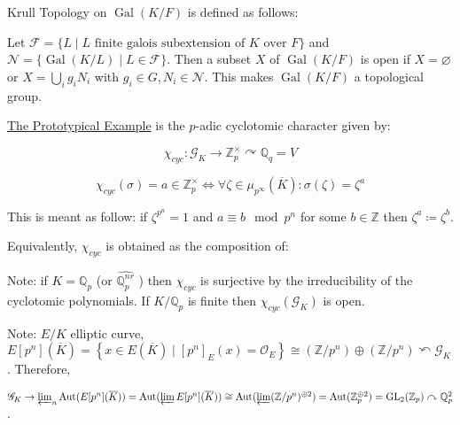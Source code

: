 \documentclass{article}
\theoremstyle{definition}
\numberwithin{theorem}{subsection}
\begin{document}
    Krull Topology on \(\operatorname{Gal}(K / F)\) is defined as follows:
    
    Let \(\mathcal{F} = \{ L \mid L \text{ finite galois subextension of } K \text{ over } F\} \) and \(\mathcal{N} = \{ \operatorname{Gal}(K / L) \mid L \in \mathcal{F} \} \). Then a subset \(X\) of \(\operatorname{Gal}(K / F)\) is open if \(X = \varnothing\) or \(X = \bigcup_i g_i N_i\) with \(g_i \in G, N_i \in \mathcal{N}\). This makes \(\operatorname{Gal}(K / F)\) a topological group.  

    \underline{The Prototypical Example} is the \(p\)-adic cyclotomic character given by:

    \[
        \chi_{cyc} : \mathscr{G}_K \to \mathbb{Z}_p^\times \curvearrowright \mathbb{Q}_q = V
    \]

    \[
        \chi_{cyc}(\sigma) = a \in \mathbb{Z}_p^\times \iff \forall \zeta \in \mu_{p^{\infty}}(\overline{K}): \sigma(\zeta) = \zeta^a
    \]

    This is meant as follow: if \(\zeta^{p^n} = 1\) and \(a \equiv b \mod p^n\) for some \(b\in \mathbb{Z}\) then \(\zeta^a \coloneqq \zeta^b\).
    
    Equivalently, \(\chi_{cyc}\) is obtained as the composition of:

    \begin{center}
    \end{center}

    Note: if \(K = \mathbb{Q}_p\) (or \(\widehat{\mathbb{Q}_p^{nr}}\) ) then \(\chi_{cyc}\) is surjective by the irreducibility of the cyclotomic polynomials. If \(K / \mathbb{Q}_{p} \) is finite then \(\chi_{cyc}(\mathscr{G}_K)\) is open.
    
    Note: \(E / K\) elliptic curve, \(E[p^n](\overline{K}) = \left\{ x\in E(\overline{K}) \mid [p^n]_E (x) = \mathcal{O}_E \right\} \cong (\mathbb{Z} / p^n) \oplus (\mathbb{Z} / p^n) \curvearrowleft \mathscr{G}_K \). Therefore,

    \(\mathscr{G}_K \to \varprojlim_n \operatorname{Aut}(E[p^n](\overline{K})) = \operatorname{Aut}(\varprojlim E[p^n](\overline{K} )) \cong \operatorname{Aut} (\varprojlim (\mathbb{Z} / p^n)^{\oplus 2}) = \operatorname{Aut} (\mathbb{Z}_p^{\oplus 2}) = \operatorname{GL}_2(\mathbb{Z}_p) \curvearrowright \mathbb{Q}_p^2\).
    
\end{document}
